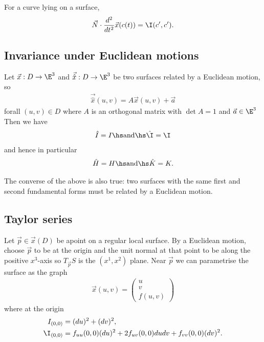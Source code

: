 \documentclass{article}
\begin{document}
\begin{proposition}
    For a curve lying on a surface,
    \begin{align*}
        \vec N\cdot \frac{d^2}{dt^2}\vec x(c(t)) = \I(c',c').
    \end{align*}
\end{proposition}

\subsection{Invariance under Euclidean motions}

\begin{theorem}
    Let $\vec x: D\to\E^3$ and $\vec{\hat x}:D\to\E^3$ be two surfaces related by a 
    Euclidean motion, so 
    \begin{align*}
        \vec{\hat x} (u,v) = A\vec x(u,v)+\vec a
    \end{align*}
    forall $(u,v)\in D$ where $A$ is an orthogonal matrix with $\det A=1$ and $\vec a\in\E^3$
    Then we have 
    \begin{align*}
        \hat I = I \hs \text{and} \hs \hat\I = \I
    \end{align*}
    and hence in particular
    \begin{align*}
        \hat H = H \hs \text{and} \hs \hat K = K.
    \end{align*}
\end{theorem}

\begin{theorem}
    The converse of the above is also true: two surfaces with the same first and second 
    fundamental forms must be related by a Euclidean motion.
\end{theorem}

\subsection{Taylor series}

\begin{proposition}
    Let $\vec p \in \vec x(D)$ be apoint on a regular local surface. By a Euclidean motion,
    choose $\vec p$ to be at the origin and the unit normal at that point to be along the positive
    $x^3$-axis so $T_{\vec p}S$ is the $(x^1,x^2)$ plane. Near $\vec p$ we can parametrise 
    the surface as the graph 
    \begin{align*}
        \vec x(u,v)=\begin{pmatrix}
            u \\ v \\ f(u,v)
        \end{pmatrix}
    \end{align*}
    where at the origin
    \begin{align*}
        I_{(0,0)}&=(du)^2+(dv)^2,\\
        \I_{(0,0)}&=f_{uu}(0,0)(du)^2+2f_{uv}(0,0)dudv+f_{vv}(0,0)(dv)^2.
    \end{align*}
\end{proposition}
\end{document}

